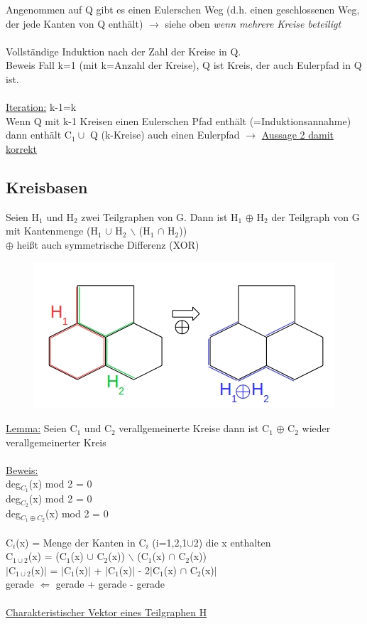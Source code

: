 Angenommen auf Q gibt es einen Eulerschen Weg (d.h. einen geschlossenen Weg, der jede Kanten von Q enthält) $\rightarrow$ siehe oben \emph{wenn mehrere Kreise beteiligt}
\\\\
Vollständige Induktion nach der Zahl der Kreise in Q.\\
Beweis Fall k=1 (mit k=Anzahl der Kreise), Q ist Kreis, der auch Eulerpfad in Q ist.
\\\\
\underline{Iteration:} k-1=k\\
Wenn Q mit k-1 Kreisen einen Eulerschen Pfad enthält (=Induktionsannahme) dann enthält C$_1 \cup$ Q (k-Kreise) auch einen Eulerpfad $\rightarrow$ \underline{Aussage 2 damit korrekt}

\subsection{Kreisbasen}
Seien H$_1$ und H$_2$ zwei Teilgraphen von G. Dann ist H$_1$ $\oplus$ H$_2$ der Teilgraph von G mit Kantenmenge (H$_1$ $\cup$ H$_2$ $\backslash$ (H$_1$ $\cap$ H$_2$))\\
$\oplus$ heißt auch symmetrische Differenz (XOR)
\begin{figure}[htp]
\centering
\includegraphics[scale=1.00]{lectures/161104/pix/pic5.jpg}
\end{figure}

\underline{Lemma:} Seien C$_1$ und C$_2$ verallgemeinerte Kreise dann ist C$_1$ $\oplus$ C$_2$ wieder verallgemeinerter Kreis
\\\\
\underline{Beweis:}\\
deg$_{C_1}$(x) mod 2 = 0\\
deg$_{C_2}$(x) mod 2 = 0\\
deg$_{C_1 \oplus C_2}$(x) mod 2 = 0
\\\\
C$_i$(x) = Menge der Kanten in C$_i$ (i=1,2,1$\cup$2) die x enthalten\\
C$_{1 \cup 2}$(x) = (C$_1$(x) $\cup$ C$_2$(x)) $\backslash$ (C$_1$(x) $\cap$ C$_2$(x))\\
$|$C$_{1 \cup 2}$(x)$|$ = $|$C$_1$(x)$|$ + $|$C$_1$(x)$|$ - 2$|$C$_1$(x) $\cap$ C$_2$(x)$|$\\
gerade $\Leftarrow$ gerade + gerade - gerade
\\\\
\underline{Charakteristischer Vektor eines Teilgraphen H}\\

